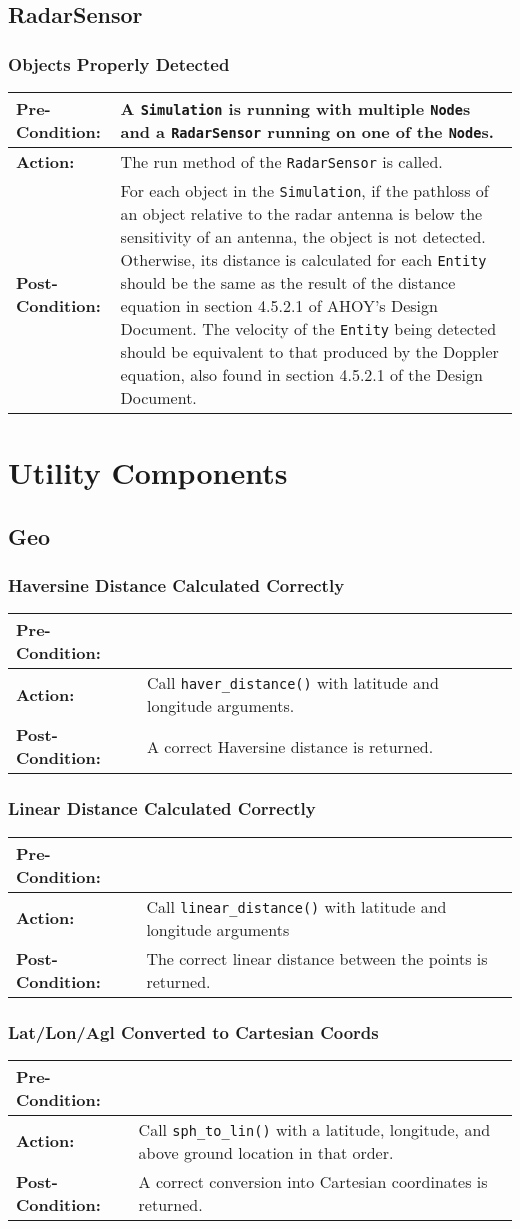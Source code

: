 \documentclass[titlepage]{article}
\newcommand{\testcase}[3]{
    \begin{center}
    \begin{tabular}{| l | p{0.7\textwidth}|}
        \hline
        \rowcolor[gray]{0.8}\textbf{Pre-Condition:} & #1 \\ \hline
        \textbf{Action:} & #2 \\ \hline
        \rowcolor[gray]{0.8}\textbf{Post-Condition:} & #3 \\ \hline
    \end{tabular}
    \end{center}
}
\begin{document}
\subsection{RadarSensor}
\subsubsection{Objects Properly Detected}
\testcase{A \texttt{Simulation} is running with multiple \texttt{Node}s and a \texttt{RadarSensor} running on one of the \texttt{Node}s.}{The run method of the \texttt{RadarSensor} is called.}{For each object in the \texttt{Simulation}, if the pathloss of an object relative to the radar antenna is below the sensitivity of an antenna, the object is not detected.  Otherwise, its distance is calculated for each \texttt{Entity} should be the same as the result of the distance equation in section 4.5.2.1 of AHOY's Design Document. The velocity of the \texttt{Entity} being detected should be equivalent to that produced by the Doppler equation, also found in section 4.5.2.1 of the Design Document.}

\section{Utility Components}
\subsection{Geo}
\subsubsection{Haversine Distance Calculated Correctly}
\testcase{}{Call \texttt{haver\_distance()} with latitude and longitude arguments.}{A correct Haversine distance is returned.}

\subsubsection{Linear Distance Calculated Correctly}
\testcase{}{Call \texttt{linear\_distance()} with latitude and longitude arguments}{The correct linear distance between the points is returned.}

\subsubsection{Lat/Lon/Agl Converted to Cartesian Coords}
\testcase{}{Call \texttt{sph\_to\_lin()} with a latitude, longitude, and above ground location in that order.}{A correct conversion into Cartesian coordinates is returned.}
\end{document}
